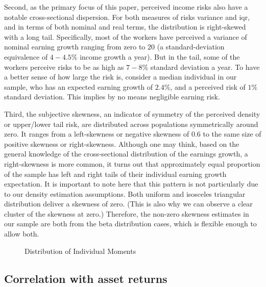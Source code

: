 \documentclass[12pt,notitlepage,onecolumn,aps,pra]{article}
\begin{document}
Second, as the primary focus of this paper, perceived income risks also
have a notable cross-sectional dispersion. For both measures of risks
variance and iqr, and in terms of both nominal and real terms, the
distribution is right-skewed with a long tail. Specifically, most of the
workers have perceived a variance of nominal earning growth ranging from
zero to \(20\) (a standard-deviation equivalence of \(4-4.5\%\) income
growth a year). But in the tail, some of the workers perceive risks to
be as high as \(7-8\%\) standard deviation a year. To have a better
sense of how large the risk is, consider a median individual in our
sample, who has an expected earning growth of \(2.4\%\), and a perceived
risk of \(1\%\) standard deviation. This implies by no means negligible
earning risk.

Third, the subjective skewness, an indicator of symmetry of the
perceived density or upper/lower tail risk, are distributed across
populations symmetrically around zero. It ranges from a left-skewness or
negative skewness of 0.6 to the same size of positive skewness or
right-skewness. Although one may think, based on the general knowledge
of the cross-sectional distribution of the earnings growth, a
right-skewness is more common, it turns out that approximately equal
proportion of the sample has left and right tails of their individual
earning growth expectation. It is important to note here that this
pattern is not particularly due to our density estimation assumptions.
Both uniform and isosceles triangular distribution deliver a skewness of
zero. (This is also why we can observe a clear cluster of the skewness
at zero.) Therefore, the non-zero skewness estimates in our sample are
both from the beta distribution cases, which is flexible enough to allow
both.


    \begin{figure}[!ht]
        \begin{center}\end{center}
        \caption{Distribution of Individual Moments}
        \label{fig:histmoms}
    \end{figure}
    
    \hypertarget{correlation-with-asset-returns}{%
\subsection{Correlation with asset
returns}\label{correlation-with-asset-returns}}
\end{document}
